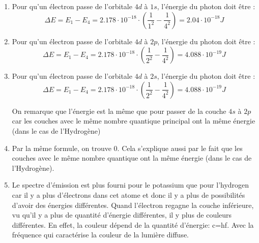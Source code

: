 \documentclass{article}
\begin{document}
\begin{enumerate}
	\item Pour qu'un électron passe de l'orbitale $4d$ à $1s$, l'énergie du photon doit être :
				$$\Delta E = E_1 - E_4 = 2.178 \cdot 10^{-18} \cdot (\frac{1}{1^2} - \frac{1}{4^2}) = 2.04 
				\cdot 10^{-18} J$$
	\item	Pour qu'un électron passe de l'orbitale $4d$ à $2p$, l'énergie du photon doit être :
				$$\Delta E = E_1 - E_4 = 2.178 \cdot 10^{-18} \cdot (\frac{1}{2^2} - \frac{1}{4^2}) = 4.088 
				\cdot 10^{-19} J$$
	\item Pour qu'un électron passe de l'orbitale $4d$ à $2s$, l'énergie du photon doit être :
				$$\Delta E = E_1 - E_4 = 2.178 \cdot 10^{-18} \cdot (\frac{1}{2^2} - \frac{1}{4^2}) = 4.088 
				\cdot 10^{-19} J$$
				
				On remarque que l'énergie est la même que pour passer de la couche $4s$ à $2p$ car les couches
				avec le même nombre quantique principal ont la même énergie (dans le cas de l'Hydrogène) %
	\item	Par la même formule, on trouve 0. Cela s'explique aussi par le fait que les couches avec le même 
				nombre quantique ont la même énergie (dans le cas de l'Hydrogène). %
	\item   Le spectre d'émission est plus fourni pour le potassium que pour l'hydrogen car il y a plus d'électrons dans cet atome et donc il y a plus de possibilités d'avoir des énergies différentes. Quand l'électron regagne la couche inférieure, vu qu'il y a plus de quantité d'énergie différentes, il y plus de couleurs différentes. En effet, la couleur dépend de la quantité d'énergie: c=hf. Avec la fréquence qui caractérise la couleur de la lumière diffuse.
\end{enumerate}
\end{document}
